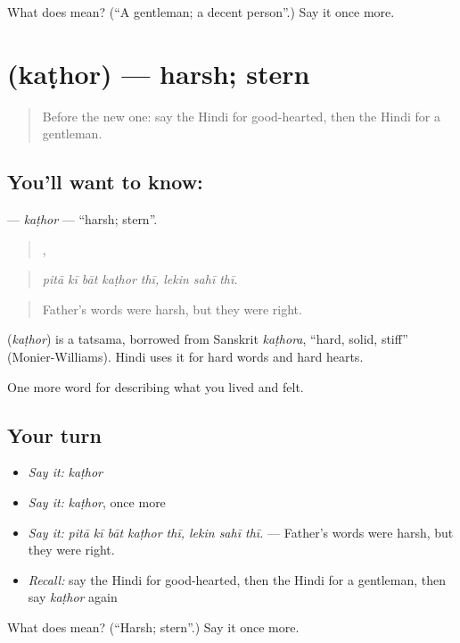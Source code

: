 \begin{tcolorbox}[breakable,colback=teal!4,colframe=teal!35!black,title={Before you move on}]
What does  mean? (\textquotedblleft{}A gentleman; a decent person\textquotedblright{}.) Say it once more.
\end{tcolorbox}
\section[\texorpdfstring{\hi{कठोर} (kaṭhor)}{कठोर (kaṭhor)}]{ (kaṭhor) — harsh; stern}

\label{lesson:HI-C466-kathor}



\begin{quote}
Before the new one: say the Hindi for good-hearted, then the Hindi for a gentleman.
\end{quote}

\subsection*{You'll want to know: }
\textbf{} — \emph{kaṭhor} — \textquotedblleft{}harsh; stern\textquotedblright{}.

\begin{quote}
    ,   
\end{quote}

\begin{quote}
\emph{pitā kī bāt kaṭhor thī, lekin sahī thī.}
\end{quote}

\begin{quote}
Father's words were harsh, but they were right.
\end{quote}

\begin{cousinweb}
\textbf{} (\emph{kaṭhor}) is a tatsama, borrowed from Sanskrit \emph{kaṭhora}, \textquotedblleft{}hard, solid, stiff\textquotedblright{} (Monier-Williams). Hindi uses it for hard words and hard hearts.
\end{cousinweb}

\begin{grammarlens}[title={What you've built}]
One more word for describing what you lived and felt.
\end{grammarlens}

\subsection*{Your turn}
\begin{itemize}
\raggedright
  \item \emph{Say it:} \emph{kaṭhor}
  \item \emph{Say it:} \emph{kaṭhor}, once more
  \item \emph{Say it:} \emph{pitā kī bāt kaṭhor thī, lekin sahī thī.} — Father's words were harsh, but they were right.
  \item \emph{Recall:} say the Hindi for good-hearted, then the Hindi for a gentleman, then say \emph{kaṭhor} again
\end{itemize}

\begin{tcolorbox}[breakable,colback=teal!4,colframe=teal!35!black,title={Before you move on}]
What does  mean? (\textquotedblleft{}Harsh; stern\textquotedblright{}.) Say it once more.
\end{tcolorbox}
